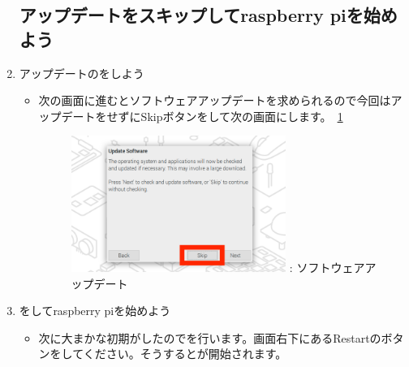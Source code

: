 \documentclass[a4paper,12pt]{jarticle}
\begin{document}
\begin{enumerate}
   \subsection{\theExercise  アップデートをスキップしてraspberry piを始めよう}   
    \item
        アップデートのをしよう
                \begin{itemize}
                  \item
                      次の画面に進むとソフトウェアアップデートを求められるので今回はアップデートをせずにSkipボタンをして次の画面にします。~\ref{seq:refFigure18}
                      \begin{figure}[h]
                        \centering
                        \begin{minipage}{5.228cm}
                          {\upshape
                            \includegraphics[width=7.000cm]{sw_image07.png}
                            \newline
                            {\theFigure\label{seq:refFigure18}}:
                            ソフトウェアアップデート}
                        \end{minipage}
                      \end{figure}
                  \end{itemize}  
    \item
        をしてraspberry piを始めよう
                \begin{itemize}
                  \item
                        次に大まかな初期がしたのでを行います。画面右下にあるRestartのボタンをしてください。そうするとが開始されます。
                        \begin{figure}[h]
                          \centering
                          \begin{minipage}{5.228cm}
                            {\upshape
}
\end{minipage}
\end{figure}
\end{itemize}
\end{enumerate}
\end{document}
